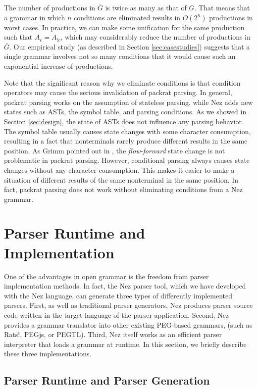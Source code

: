 \documentclass[preprint]{sigplanconf}
\begin{document}
The number of productions in $\bar{G}$ is twice as many as that of $G$. That means that a grammar in which $n$ conditions are eliminated results in $O(2^n)$ productions in worst cases. 
In practice, we can make some unification for the same production such that $A_c = A_{!c}$, which may considerably reduce the number of productions in $\bar{G}$. Our empirical study (as described in Section \ref{sec:casestudies}) suggests that a single grammar involves not so many conditions that it would cause such an exponential increase of productions.

Note that the significant reason why we eliminate conditions is that condition operators may cause the serious invalidation of packrat parsing. In general, packrat parsing works on the assumption of stateless parsing\cite{ICFP02_PackratParsing}, while Nez adds new states such as ASTs, the symbol table, and parsing conditions. As we showed in Section \ref{sec:design}, the state of  ASTs does not influence any parsing behavior. The symbol table usually causes state changes with some character consumption, resulting in a fact that nonterminals rarely produce different results in the same position. As Grimm pointed out in \cite{PLDI06_Rats}, the {\em flow-forward} state change is not problematic in packrat parsing.  However, conditional parsing always causes state changes without any character consumption. This makes it easier to make a situation of different results of the same nonterminal in the same position. In fact, packrat parsing does not work without eliminating conditions from a Nez grammar. 

\section{Parser Runtime and Implementation} \label{sec:impl}

One of the advantages in open grammar is the freedom from parser implementation methods. In fact, the Nez parser tool, which we have developed with the Nez language, can generate three types of differently implemented parsers. First, as well as traditional parser generators, Nez produces parser source code written in the target language of the parser application. Second, Nez provides a grammar translator into other existing PEG-based grammars, (such as Rats$!$, PEGjs, or PEGTL). Third, Nez itself works as an efficient parser interpreter that loads a grammar at runtime. In this section, we briefly describe these three implementations. 

\subsection{Parser Runtime and Parser Generation} 
\end{document}
